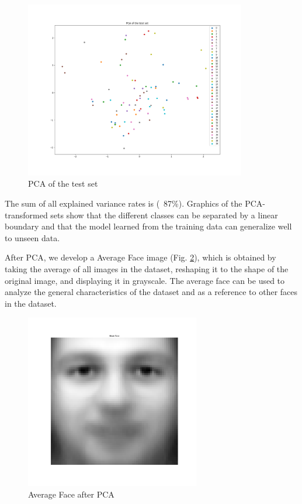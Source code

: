 \documentclass[conference]{IEEEtran}
\begin{document}
\begin{figure}[H]
    \centering
    \includegraphics[width=3.8in]{pca_of_the_test_set.png}
    \caption{PCA of the test set}
    \label{img:pca_of_the_test_set.png}
\end{figure}

The sum of all explained variance rates is (~87\%). Graphics of the PCA-transformed sets show that the different classes can be separated by a linear boundary and that the model learned from the training data can generalize well to unseen data.

After PCA, we develop a Average Face image (Fig. \ref{img:mean_face.png}), which is obtained by taking the average of all images in the dataset, reshaping it to the shape of the original image, and displaying it in grayscale. The average face can be used to analyze the general characteristics of the dataset and as a reference to other faces in the dataset.

\begin{figure}[H]
    \centering
    \includegraphics[width=3.0in]{mean_face.png}
    \caption{Average Face after PCA}
    \label{img:mean_face.png}
\end{figure}
\end{document}

